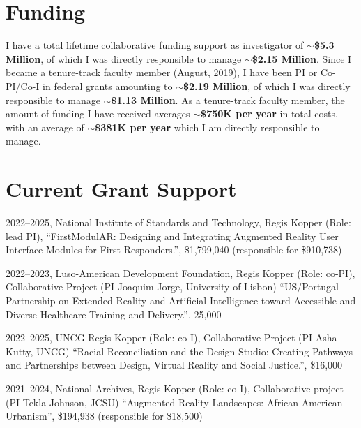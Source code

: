 \documentclass[wideaddress]{vitae}
\begin{document}
\section{Funding}
    I have a total lifetime collaborative funding support as investigator of \textbf{$\sim$\$5.3 Million}, of which I was directly responsible to manage \textbf{$\sim$\$2.15 Million}. Since I became a tenure-track faculty member (August, 2019), I have been PI or Co-PI/Co-I in federal grants amounting to \textbf{$\sim$\$2.19 Million}, of which I was directly responsible to manage \textbf{$\sim$\$1.13 Million}. As a tenure-track faculty member, the amount of funding I have received averages \textbf{$\sim$\$750K per year} in total costs, with an average of \textbf{$\sim$\$381K per year} which I am directly responsible to manage.%

\section{Current Grant Support}
\begin{etaremune}
	\item{2022--2025, National Institute of Standards and Technology, Regis Kopper (Role: lead PI), ``FirstModulAR: Designing and Integrating Augmented Reality User Interface Modules for First Responders.'', \$1,799,040 (responsible for \$910,738)}
	\item{2022--2023, Luso-American Development Foundation, Regis Kopper (Role: co-PI), Collaborative Project (PI Joaquim Jorge, University of Lisbon) ``US/Portugal Partnership on Extended Reality and Artificial Intelligence toward Accessible and Diverse Healthcare Training and Delivery.'', 25,000~\EURtm}
	\item{2022--2025, UNCG Regis Kopper (Role: co-I), Collaborative Project (PI Asha Kutty, UNCG) ``Racial Reconciliation and the Design Studio: Creating Pathways and Partnerships between Design, Virtual Reality and Social Justice.'', \$16,000}
	\item{2021--2024, National Archives, Regis Kopper (Role: co-I), Collaborative project (PI Tekla Johnson, JCSU) ``Augmented Reality Landscapes: African American Urbanism'', \$194,938 (responsible for \$18,500)}
\end{etaremune}
\end{document}
